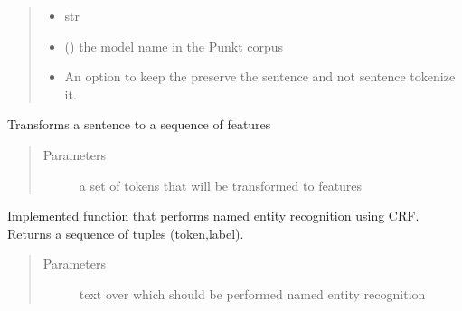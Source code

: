 \documentclass[letterpaper,10pt,english]{sphinxmanual}
\begin{document}
\begin{fulllineitems}
\begin{fulllineitems}
\begin{quote}
\begin{description}
\begin{itemize}
\item {} 
 \textendash{} str

\item {} 
 () \textendash{} the model name in the Punkt corpus

\item {} 
 \textendash{} An option to keep the preserve the sentence and not sentence tokenize it.

\end{itemize}

\end{description}\end{quote}

\end{fulllineitems}


\begin{fulllineitems}
\label{\detokenize{index:ner_plugins.NER_CRF.NER_CRF.doc2features}}
Transforms a sentence to a sequence of features
\begin{quote}\begin{description}
\item[{Parameters}] \leavevmode
{} \textendash{} a set of tokens that will be transformed to features

\end{description}\end{quote}

\end{fulllineitems}


\begin{fulllineitems}
\label{\detokenize{index:ner_plugins.NER_CRF.NER_CRF.perform_NER}}
Implemented function that performs named entity recognition using CRF. Returns a sequence of tuples (token,label).
\begin{quote}\begin{description}
\item[{Parameters}] \leavevmode
{} \textendash{} text over which should be performed named entity recognition


\end{description}
\end{quote}
\end{fulllineitems}
\end{fulllineitems}
\end{document}
